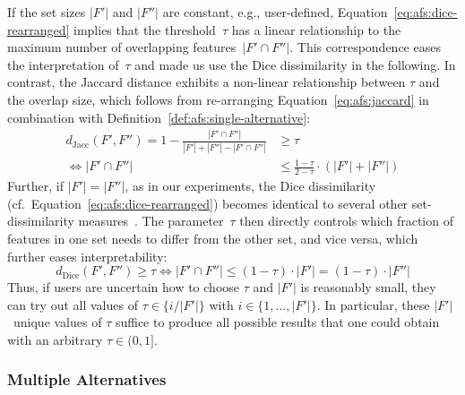 \documentclass{article}
\theoremstyle{definition}
\begin{document}
If the set sizes $|F'|$ and $|F''|$ are constant, e.g., user-defined, Equation~\ref{eq:afs:dice-rearranged} implies that the threshold~$\tau$ has a linear relationship to the maximum number of overlapping features~$|F' \cap F''|$.
This correspondence eases the interpretation of~$\tau$ and made us use the Dice dissimilarity in the following.
In contrast, the Jaccard distance exhibits a non-linear relationship between $\tau$ and the overlap size, which follows from re-arranging Equation~\ref{eq:afs:jaccard} in combination with Definition~\ref{def:afs:single-alternative}:
%
\begin{equation}
	\begin{aligned}
		d_{\text{Jacc}}(F',F'') = 1 - \frac{|F' \cap F''|}{|F'| + |F''| - |F' \cap F''|} &\geq \tau \\
		\Leftrightarrow |F' \cap F''| &\leq \frac{1 - \tau}{2 - \tau} \cdot (|F'| + |F''|)
		\end{aligned}
	\label{eq:afs:jaccard-rearranged}
\end{equation}
%
Further, if $|F'| = |F''|$, as in our experiments, the Dice dissimilarity (cf.~Equation~\ref{eq:afs:dice-rearranged}) becomes identical to several other set-dissimilarity measures~\cite{egghe2009new}.
The parameter~$\tau$ then directly controls which fraction of features in one set needs to differ from the other set, and vice versa, which further eases interpretability:
%
\begin{equation}
	d_{\text{Dice}}(F',F'') \geq \tau \Leftrightarrow |F' \cap F''| \leq (1 - \tau) \cdot |F'| = (1 - \tau) \cdot |F''|
	\label{eq:afs:dice-rearranged-equal-size}
\end{equation}
%
Thus, if users are uncertain how to choose $\tau$ and $|F'|$ is reasonably small, they can try out all values of $\tau \in \{i / |F'|\}$ with $i \in \{1, \dots, |F'|\}$.
In particular, these $|F'|$~unique values of $\tau$ suffice to produce all possible results that one could obtain with an arbitrary $\tau \in (0,1]$.

\subsubsection{Multiple Alternatives}
\label{sec:afs:approach:constraints:multiple}
\end{document}
